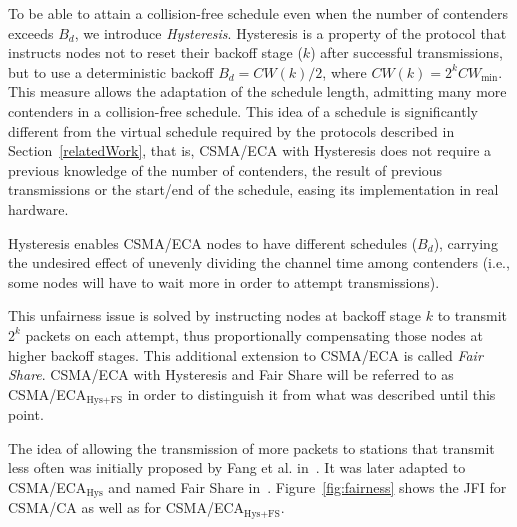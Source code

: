 \documentclass[a4paper,journal]{IEEEtran}
\begin{document}
	To be able to attain a collision-free schedule even when the number of contenders exceeds $B_{d}$, we introduce \emph{Hysteresis}. Hysteresis is a property of the protocol that instructs nodes not to reset their backoff stage ($k$) after successful transmissions, but to use a deterministic backoff $B_{d}=CW(k)/2$, where $CW(k)=2^{k}CW_{\min}$. This measure allows the adaptation of the schedule length, admitting many more contenders in a collision-free schedule. This idea of a schedule is significantly different from the virtual schedule required by the protocols described in Section~\ref{relatedWork}, that is, CSMA/ECA with Hysteresis does not require a previous knowledge of the number of contenders, the result of previous transmissions or the start/end of the schedule, easing its implementation in real hardware.
	
	Hysteresis enables CSMA/ECA nodes to have different schedules ($B_{d}$), carrying the undesired effect of unevenly dividing the channel time among contenders (i.e., some nodes will have to wait more in order to attempt transmissions).
	
	This unfairness issue is solved by instructing nodes at backoff stage $k$ to transmit $2^{k}$ packets on each attempt, thus proportionally compensating those nodes at higher backoff stages. This additional extension to CSMA/ECA is called \emph{Fair Share}. CSMA/ECA with Hysteresis and Fair Share will be referred to as CSMA/ECA$_{\text{Hys+FS}}$ in order to distinguish it from what was described until this point.
	
	The idea of allowing the transmission of more packets to stations that transmit less often was initially proposed by Fang et al. in~\cite{L_MAC}. It was later adapted to CSMA/ECA$_{\text{Hys}}$ and named Fair Share in~\cite{research2standards}. Figure~\ref{fig:fairness} shows the JFI for CSMA/CA as well as for CSMA/ECA$_{\text{Hys+FS}}$.
	
\end{document}

